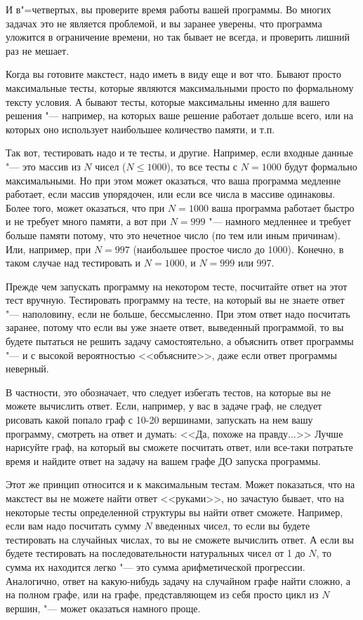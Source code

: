 \documentclass[a4paper,10pt]{problems}
\begin{document}
И в"=четвертых, вы проверите время работы вашей программы. 
Во многих задачах это не является проблемой, и вы заранее уверены, что программа уложится в ограничение времени, 
но так бывает не всегда, и проверить лишний раз не мешает.

Когда вы готовите макстест, надо иметь в виду еще и вот что. 
Бывают просто максимальные тесты, которые являются максимальными просто по формальному тексту условия.
А бывают тесты, которые максимальны именно для вашего решения "--- например, на которых ваше решение работает дольше всего,
или на которых оно использует наибольшее количество памяти, и т.п.

Так вот, тестировать надо и те тесты, и другие. 
Например, если входные данные "--- это массив из $N$ чисел ($N\leq 1000$), то все тесты с $N=1000$ будут формально максимальными.
Но при этом может оказаться, что ваша программа медленне работает, если массив упорядочен, или если все числа в массиве одинаковы.
Более того, может оказаться, что при $N=1000$ ваша программа работает быстро и не требует много памяти, а вот при $N=999$ "--- 
намного медленнее и требует больше памяти потому, что это нечетное число (по тем или иным причинам). Или, например, при $N=997$ 
(наибольшее простое число до 1000). Конечно, в таком случае над тестировать и $N=1000$, и $N=999$ или 997.

 Прежде чем запускать программу на некотором тесте, посчитайте ответ на этот тест вручную. 
Тестировать программу на тесте, на который вы не знаете ответ "--- наполовину, если не больше, бессмысленно.
При этом ответ надо посчитать заранее, потому что если вы уже знаете ответ, выведенный программой, 
то вы будете пытаться не решить задачу самостоятельно, а объяснить ответ программы "--- и с высокой вероятностью <<объясните>>, 
даже если ответ программы неверный.

В частности, это обозначает, что следует избегать тестов, на которые вы не можете вычислить ответ. 
Если, например, у вас в задаче граф, не следует рисовать какой попало граф с 10-20 вершинами, запускать на нем вашу программу, смотреть на ответ и думать:
<<Да, похоже на правду...>> Лучше нарисуйте граф, на который вы сможете посчитать ответ, или все-таки потратьте время и найдите ответ на задачу 
на вашем графе ДО запуска программы.

Этот же принцип относится и к максимальным тестам. Может показаться, что на макстест вы не можете найти ответ <<руками>>, но зачастую бывает,
что на некоторые тесты определенной структуры вы найти ответ сможете. 
Например, если вам надо посчитать сумму $N$ введенных чисел, то если вы будете тестировать на случайных числах, то вы не сможете вычислить ответ. 
А если вы будете тестировать на последовательности натуральных чисел от 1 до $N$, то сумма их находится легко "--- это сумма арифметической прогрессии.
Аналогично, ответ на какую-нибудь задачу на случайном графе найти сложно, а на полном графе, или на графе, представляющем из себя просто цикл из $N$ вершин,
"--- может оказаться намного проще.
\end{document}
